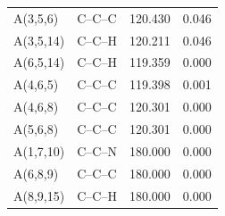 \begin{longtable}{llrr}
A(3,5,6) & C--C--C & 120.430 & 0.046 \\
A(3,5,14) & C--C--H & 120.211 & 0.046 \\
A(6,5,14) & C--C--H & 119.359 & 0.000 \\
A(4,6,5) & C--C--C & 119.398 & 0.001 \\
A(4,6,8) & C--C--C & 120.301 & 0.000 \\
A(5,6,8) & C--C--C & 120.301 & 0.000 \\
A(1,7,10) & C--C--N & 180.000 & 0.000 \\
A(6,8,9) & C--C--C & 180.000 & 0.000 \\
A(8,9,15) & C--C--H & 180.000 & 0.000 \\
\bottomrule
\end{longtable}
